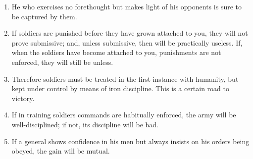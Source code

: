 \documentclass[oneside]{book}
\begin{document}
\begin{enumerate}
	\item He who exercises no forethought but makes light of his opponents is sure to be captured by them.
	\item If soldiers are punished before they have grown attached to you, they will not prove submissive; and, unless submissive, then will be practically useless. If, when the soldiers have become attached to you, punishments are not enforced, they will still be unless.
	\item Therefore soldiers must be treated in the first instance with humanity, but kept under control by means of iron discipline. This is a certain road to victory.
	\item If in training soldiers commands are habitually enforced, the army will be well-disciplined; if not, its discipline will be bad.
	\item If a general shows confidence in his men but always insists on his orders being obeyed, the gain will be mutual.
\end{enumerate}
\end{document}
